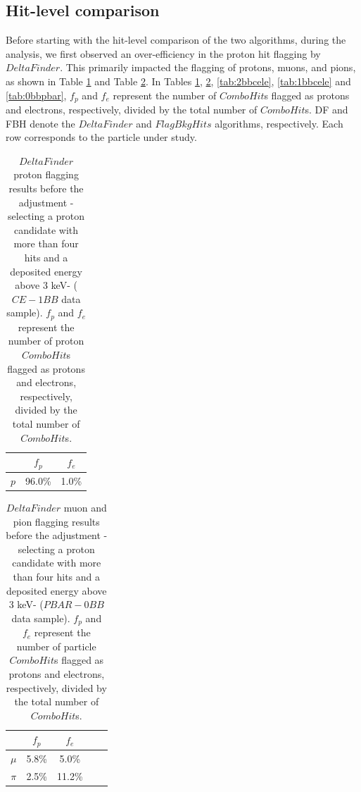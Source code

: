 \subsection{Hit-level comparison}
Before starting with the hit-level 
comparison of the two algorithms, during the analysis, 
we first observed an over-efficiency 
in the proton hit flagging by $DeltaFinder$. 
This primarily impacted the flagging of 
protons, muons, and pions, as shown in 
Table \ref{tab:1bbcelebefore} and Table 
\ref{tab:0bbpbarbefore}. In Tables 
\ref{tab:1bbcelebefore}, \ref{tab:0bbpbarbefore}, 
\ref{tab:2bbcele}, \ref{tab:1bbcele} and 
\ref{tab:0bbpbar}, $f_p$ and 
$f_e$ represent 
the number of $ComboHit$s flagged as 
protons and electrons, respectively, 
divided by the total number of 
$ComboHit$s. DF and FBH denote the $DeltaFinder$ 
and $FlagBkgHits$ algorithms, 
respectively. Each row corresponds to the particle 
under study.
\begin{center}
    \begin{table}[h!]
    \centering
    \renewcommand{\arraystretch}{1.}
    \begin{tabular}{| c | c | c |} 
    \hline
    & $f_{p}$ & $f_{e}$ \\
    \hline
    $p$     & 96.0\% & 1.0\% \\
    \hline
    \end{tabular}
    \caption{$DeltaFinder$ proton 
    flagging results before the 
    adjustment -selecting a proton 
    candidate with more than four hits 
    and a deposited energy above 3 keV- ($CE-1BB$ data sample). 
    $f_p$ and $f_e$ represent 
    the number of proton $ComboHit$s 
    flagged as protons and electrons, respectively, 
    divided by the total number of $ComboHit$s.}
    \label{tab:1bbcelebefore}
    \end{table}
\end{center}
    
\begin{center}
    \begin{table}[h!]
        \centering
        \renewcommand{\arraystretch}{1.}
        \begin{tabular}{| c | c | c | c | c|} 
        \hline
        &   $f_{p}$ &   $f_{e}$\\
        \hline
        $\mu$ &  5.8\%  & 5.0\%\\
        \hline
        $\pi$ & 2.5\% &  11.2\%\\
        \hline
        \end{tabular}
        \caption{
            $DeltaFinder$ muon 
        and pion flagging results before the 
        adjustment -selecting a proton 
        candidate with more than four hits 
        and a deposited energy above 3 keV- 
        ($PBAR-0BB$ data sample). $f_p$ and 
        $f_e$ represent 
        the number of particle $ComboHit$s 
        flagged as protons and electrons, respectively, 
        divided by the total number of $ComboHit$s.}
        \label{tab:0bbpbarbefore}
    \end{table}
\end{center}

